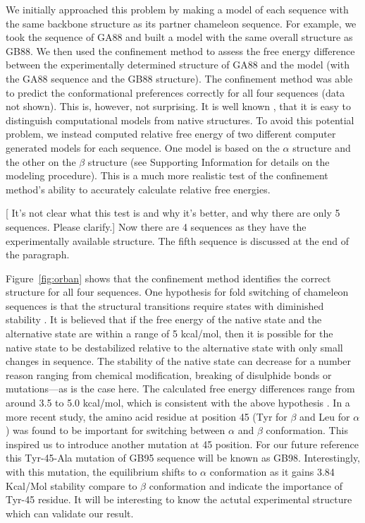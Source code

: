 \documentclass[12pt]{article}
\newcommand{\Arijit}[1]{\color{magenta}#1\normalcolor}
\newcommand{\Ken}[1]{\color{red}#1\normalcolor}
\begin{document}
We initially approached this problem by making a model of each sequence with the same backbone
structure as its partner chameleon sequence. For example, we took the sequence of GA88 and built a
model with the same overall structure as GB88. We then used the confinement method to assess the
free energy difference between the experimentally determined structure of GA88 and the model (with
the GA88 sequence and the GB88 structure). The confinement method was able to predict the
conformational preferences correctly for all four sequences (data not shown). This is, however, not
surprising. It is well known \cite{Handl2009},\cite{Sheffler2009} that it is easy to distinguish 
computational models from native structures. To avoid this potential problem, we instead computed relative free energy of two
different computer generated models for each sequence. One model is based on the $\alpha$ structure and
the other on the $\beta$ structure (see Supporting Information for details on the modeling procedure).
This is a much more realistic test of the confinement method's ability to accurately calculate
relative free energies. 
 
\Ken{[ It's not clear what this test is and why it's better, and why there are only 5 sequences.  Please clarify.]}
\Arijit{ Now there are 4 sequences as they have the experimentally available structure. The fifth sequence is discussed 
at the end of the paragraph.}


Figure~\ref{fig:orban} shows that the confinement method identifies the correct structure for all four sequences. One hypothesis for fold switching of
chameleon sequences is that the structural transitions require states with diminished stability
\cite{Bryan2010}. It is believed that if the free energy of the native state and the alternative state are
within a range of 5 kcal/mol, then it is possible for the native state to be destabilized relative
to the alternative state with only small changes in sequence. The stability of the native state can
decrease for a number reason ranging from chemical modification, breaking of disulphide bonds or
mutations---as is the case here. The calculated free energy differences range from around 3.5 to 5.0
kcal/mol, which is consistent with the above hypothesis \cite{He2008,Alexander2009,Bryan2010}. 
In a more recent study\cite{He2012}, the amino acid residue at position 45 (Tyr for $\beta$ and Leu for $\alpha$) was
found to be important for switching between  $\alpha$ and $\beta$ conformation. This inspired us to 
introduce another mutation at 45 position. For our future reference this Tyr-45-Ala mutation of GB95 sequence will
be known as GB98. Interestingly, with this mutation, the equilibrium shifts to $\alpha$ conformation as it gains 3.84 Kcal/Mol 
stability compare to $\beta$ conformation and indicate the importance of Tyr-45 residue. It will be interesting to 
know the actutal experimental structure which can validate our result.  
\end{document}
